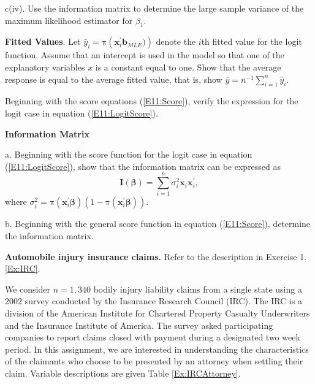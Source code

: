 \begin{exercises}
c(iv). Use the information matrix to determine the large sample
variance of the maximum likelihood estimator for $\beta_1$.



\item \textbf{Fitted Values}. Let $\widehat{y}_i =  \mathrm{\pi }\left( \mathbf{x}_i^{\prime}
\mathbf{b}_{MLE})\right)$ denote the $i$th fitted value for the
logit function. Assume that an intercept is used in the model so
that one of the explanatory variables $x$ is a constant equal to
one. Show that the average response is equal to the average fitted
value, that is, show $\overline{y} = n^{-1} \sum_{i=1}^n
\widehat{y}_i $.


\item Beginning with the score equations (\ref{E11:Score}), verify the expression for the logit case
in equation (\ref{E11:LogitScore}).

\item \textbf{Information Matrix}

a. Beginning with the score function for the logit case in equation
(\ref{E11:LogitScore}), show that the information matrix can be
expressed as
\begin{equation*}
\mathbf{I}(\boldsymbol \beta) = \sum\limits_{i=1}^{n}
 \sigma_i^2 \mathbf{x}_i\mathbf{x}_i^{\mathbf{\prime }},
\end{equation*}
where $\sigma_i^2 = \mathrm{\pi}(\mathbf{x}_i^{\prime} \boldsymbol
\beta)(1-\mathrm{\pi}(\mathbf{x}_i^{\prime}\boldsymbol \beta))$.

b. Beginning with the general score function in equation
(\ref{E11:Score}), determine the information matrix.


\item \textbf{Automobile injury insurance claims.} Refer to the description in
Exercise 1.\ref{Ex:IRC}.

We consider $n=1,340$ bodily injury liability claims from a single
state using a 2002 survey conducted by the Insurance Research
Council (IRC). The IRC is a division of the American Institute for
Chartered Property Casualty Underwriters and the Insurance Institute
of America. The survey asked participating companies to report
claims closed with payment during a designated two week period. In
this assignment, we are interested in understanding the
characteristics of the claimants who choose to be presented by an
attorney when settling their claim. Variable descriptions are given
Table \ref{Ex:IRCAttorney}.



\end{exercises}
